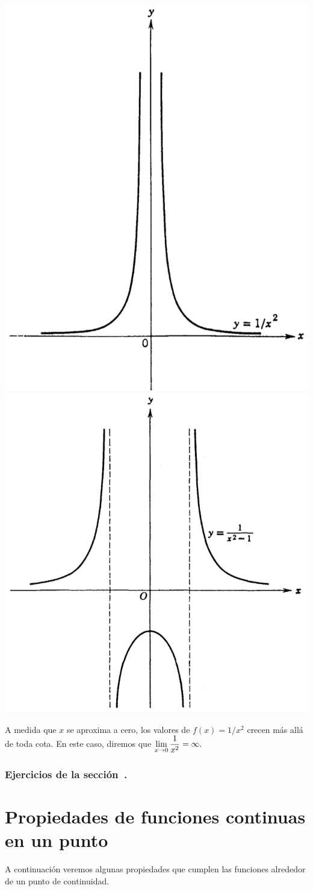 \centerline{
\includegraphics[width=.4\textwidth]{pics/discontinuidad-infinita.png}
\hfil
\includegraphics[width=.5\textwidth]{pics/dos-discontinuidades-infinitas.png}
}

A medida que $x$ se aproxima a cero, los valores de $f(x)=1/x^2$ crecen más allá de toda cota. En este caso, diremos que $\displaystyle\lim_{x\to0} \frac1{x^2}=\infty.$

\subsubsection*{Ejercicios de la sección~.}


\begin{enumerate}

\end{enumerate}

\section{Propiedades de funciones continuas en un punto}\label{S:continuidad-propiedades}

A continuación veremos algunas propiedades que cumplen las funciones alrededor de un punto de continuidad.

